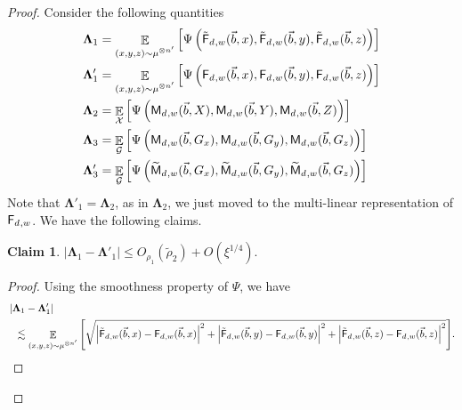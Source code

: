 \documentclass[10pt,a4paper]{amsart}
\newtheorem{claim}[thm]{Claim}
\newcommand\card[1]{\left| {#1} \right|}
\newcommand\Expect[2]{{\mathop{\mathbb{E}}_{#1}\left[ {#2} \right]}}
\renewcommand\leq{\leqslant}
\newcommand{\V}[1]{{#1}}
\begin{document}
\begin{proof}
Consider the following quantities
\begin{align*}
    \mathbf{\Lambda}_1 &= \Expect{\substack{(\V x, \V y, \V z)\sim \mu^{\otimes n'}}}{\Psi\left(\truncfcoarsedecoupled_{,\V w}(\vec{b},\V x), \truncfcoarsedecoupled_{,\V w}(\vec{b}, \V y),  \truncfcoarsedecoupled_{,\V w}(\vec{b}, \V z)\right)}\\
    \mathbf{\Lambda}_1' &= \Expect{\substack{(\V x, \V y, \V z)\sim \mu^{\otimes n'}}}{\Psi\left(\fcoarsedecoupled_{,\V w}(\vec{b},\V x), \fcoarsedecoupled_{,\V w}(\vec{b}, \V y),  \fcoarsedecoupled_{,\V w}(\vec{b}, \V z)\right)}\\
    \mathbf{\Lambda}_2 &= \Expect{\mathbf{\mathcal{X}}}{\Psi\left(\multilinfcoarsedecoupled_{,\V w}(\vec{b}, X), \multilinfcoarsedecoupled_{,\V w}(\vec{b}, Y),  \multilinfcoarsedecoupled_{,\V w}(\vec{b}, Z)\right)}\\
     \mathbf{\Lambda}_3 &= \Expect{\mathbf{\mathcal{G}}}{\Psi\left(\multilinfcoarsedecoupled_{,\V w}(\vec{b}, G_x), \multilinfcoarsedecoupled_{,\V w}(\vec{b}, G_y),  \multilinfcoarsedecoupled_{,\V w}(\vec{b}, G_z)\right)}\\
   \mathbf{\Lambda}_3' &= \Expect{\mathbf{\mathcal{G}}}{\Psi\left(\truncmultilinfcoarsedecoupled_{,\V w}(\vec{b}, G_x), \truncmultilinfcoarsedecoupled_{,\V w}(\vec{b}, G_y),  \truncmultilinfcoarsedecoupled_{,\V w}(\vec{b}, G_z)\right)}
\end{align*}
    Note that  $\mathbf{\Lambda}'_1 =  \mathbf{\Lambda}_2$, as in $\mathbf{\Lambda}_2$, we just moved to the multi-linear representation of $\fcoarsedecoupled_{,\V w}$. We have the following claims.
   \begin{claim}\label{claim:inv_truncation}
        $\card{\mathbf{\Lambda}_1 -  \mathbf{\Lambda}'_1 }\leq O_{\rho_1}(\tilde{\rho}_2) + O(\xi^{1/4}).$
   \end{claim}
   \begin{proof}
           Using the smoothness property of $\Psi$, we have 
       \begin{align*}
          & \card{\mathbf{\Lambda}_1 -  \mathbf{\Lambda}'_1 } \\
          &~~
          \lesssim \Expect{\substack{(\V x, \V y, \V z)\sim \mu^{\otimes n'}}}{\sqrt{\card{\truncfcoarsedecoupled_{,\V w}(\vec{b},\V x) - \fcoarsedecoupled_{,\V w}(\vec{b},\V x) }^2 + \card{\truncfcoarsedecoupled_{,\V w}(\vec{b},\V y) - \fcoarsedecoupled_{,\V w}(\vec{b},\V y) }^2+ \card{\truncfcoarsedecoupled_{,\V w}(\vec{b},\V z) - \fcoarsedecoupled_{,\V w}(\vec{b},\V z) }^2}}.
           \end{align*}

\end{proof}
\end{proof}
\end{document}
